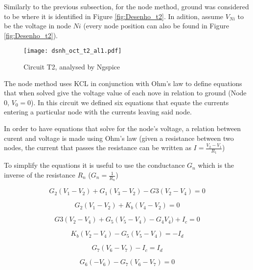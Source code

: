 Similarly to the previous subsection, for the node method, ground was considered to be where it is identified in
Figure \ref{fig:Desenho_t2}. In adition, assume $V_{Ni}$ to be the voltage in node $Ni$ (every node position can
also be found in Figure \ref{fig:Desenho_t2}). \\

\begin{figure}[ht]
	\centering
	\texttt{[image: dsnh\_oct\_t2\_al1.pdf]}
	\caption{Circuit T2, analysed by Ngspice}
\label{fig:Dsnh_sim_t2}
\end{figure}


The node method uses KCL in conjunction with Ohm’s law to define equations that when solved give the voltage value 
of each nove in relation to ground (Node 0, $V_0 = 0$). In this circuit we defined six equations that equate the 
currents entering a particular node with the currents leaving said node. 

In order to have equations that solve for the node’s voltage, a relation between curent and voltage is made using 
Ohm’s law (given a resistance between two nodes, the current that passes the resistance can be written as 
$I=\frac{V_2-V_1}{R_1}$)

To simplify the equations it is useful to use the conductance $G_n$ which is the inverse of the resistance $R_n$ 
($G_n=\frac{1}{R_n}$)

\begin{equation}
	G_2(V_1-V_2)+G_1(V_3-V_2) - G3(V_2-V_4) = 0
	\label{}
\end{equation}

\begin{equation}
	G_2(V_1-V_2)+K_b(V_4-V_2) = 0
	\label{}
\end{equation}

\begin{equation}
	G3(V_2-V_4)+G_5(V_5-V_4)-G_4V_4)+I_c=0
	\label{}
\end{equation} 

\begin{equation}
	K_b(V_2-V_4)-G_5(V_5-V_4)=-I_d
	\label{}
\end{equation}

\begin{equation}
	G_7(V_6-V_7)-I_c=I_d
	\label{}
\end{equation}

\begin{equation}
	G_6(-V_6)-G_7(V_6-V_7)=0
	\label{}
\end{equation}

